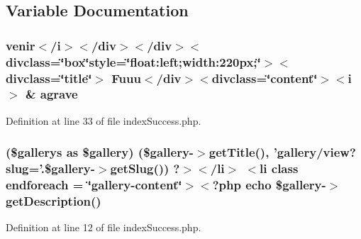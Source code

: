 \subsection{Variable Documentation}
\hypertarget{frontend_2modules_2gallery_2templates_2index_success_8php_a184a65fae2dd681d3cfaff490e159465}{
\subsubsection[{agrave}]{\setlength{\rightskip}{0pt plus 5cm}venir$<$/{\bf i}$>$$<$/div$>$$<$/div$>$$<$divclass=\char`\"{}box\char`\"{}style=\char`\"{}float\-:left;width\-:220px;\char`\"{}$>$$<$divclass=\char`\"{}title\char`\"{}$>$ Fuuu$<$/div$>$$<$divclass=\char`\"{}content\char`\"{}$>$$<$i$>$ \& agrave}}\label{frontend_2modules_2gallery_2templates_2index_success_8php_a184a65fae2dd681d3cfaff490e159465}


Definition at line 33 of file index\-Success.\-php.

\hypertarget{frontend_2modules_2gallery_2templates_2index_success_8php_a1564a48b746a96e888ba07e118a7002c}{
\subsubsection[{endforeach}]{ (\$gallerys as \$gallery) (\$gallery-\/$>${\bf get\-Title}(), 'gallery/view?{\bf slug}='.\$gallery-\/$>$get\-Slug()) ?$>$$<$/li$>$ $<$li {\bf class} endforeach = \char`\"{}gallery-\/content\char`\"{}$>$$<$?php echo \$gallery-\/$>$get\-Description()}}\label{frontend_2modules_2gallery_2templates_2index_success_8php_a1564a48b746a96e888ba07e118a7002c}


Definition at line 12 of file index\-Success.\-php.

